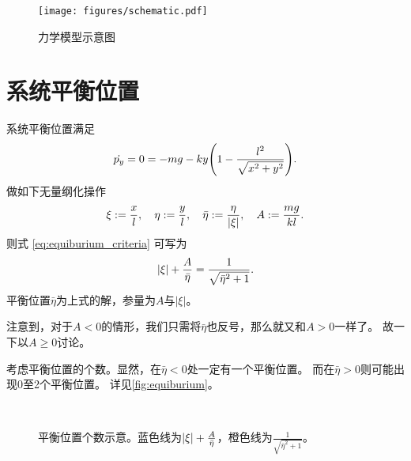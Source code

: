 \documentclass[a4paper,unicode]{report}
\begin{document}
\begin{figure}
    \centering
    \texttt{[image: figures/schematic.pdf]}
    \caption{力学模型示意图}
    \label{fig:schematic}
\end{figure}

\section{系统平衡位置}\label{sec:equiburium}

系统平衡位置满足
\begin{equation}\label{eq:equiburium_criteria}
    \dot{p_y} = 0 = -mg-ky\qty(1-\frac{l^2}{\sqrt{x^2+y^2}}).
\end{equation}
做如下无量纲化操作
\begin{equation}
    \xi := \frac{x}{l},\quad
    \eta := \frac{y}{l},\quad
    \bar{\eta} := \frac{\eta}{\qty|\xi|},\quad
    A := \frac{mg}{kl}.
\end{equation}
则式 \eqref{eq:equiburium_criteria} 可写为
\begin{equation}
    \qty|\xi| + \frac{A}{\bar{\eta}} = \frac{1}{\sqrt{\bar{\eta}^2 + 1}}.
\end{equation}
平衡位置$\bar{\eta}$为上式的解，参量为$A$与$|\xi|$。

注意到，对于$A<0$的情形，我们只需将$\bar{\eta}$也反号，那么就又和$A>0$一样了。
故一下以$A\ge 0$讨论。

考虑平衡位置的个数。显然，在$\bar{\eta}<0$处一定有一个平衡位置。
而在$\bar{\eta} > 0$则可能出现0至2个平衡位置。
详见\autoref{fig:equiburium}。

\begin{figure}
    \centering
    \\
    \caption{平衡位置个数示意。蓝色线为$\qty|\xi| + \frac{A}{\bar{\eta}}$，橙色线为$\frac{1}{\sqrt{\bar{\eta}^2 + 1}}$。}
    \label{fig:equiburium}
\end{figure}
\end{document}
